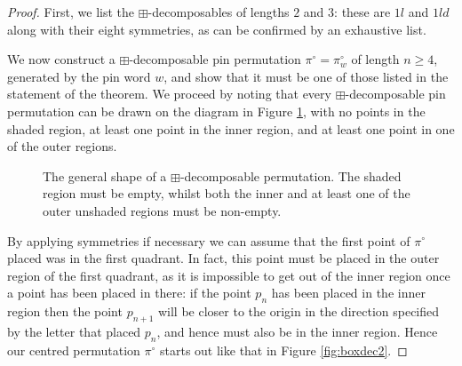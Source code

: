 \documentclass[11pt,a4paper]{article}
\theoremstyle{definition}
\begin{document}
\begin{proof}
First, we list the $\boxplus$-decomposables of lengths $2$ and $3$: these are $1l$ and $1ld$ along with their eight symmetries, as can be confirmed by an exhaustive list.

We now construct a $\boxplus$-decomposable pin permutation $\pi^{\circ} = \pi^{\circ}_{w}$ of length $n \geq 4$, generated by the pin word $w$, and show that it must be one of those listed in the statement of the theorem. We proceed by noting that every $\boxplus$-decomposable pin permutation can be drawn on the diagram in Figure \ref{fig:boxdec1}, with no points in the shaded region, at least one point in the inner region, and at least one point in one of the outer regions.


\begin{figure}[h]
\begin{center}
\end{center}
\caption{The general shape of a $\boxplus$-decomposable permutation. The shaded region must be empty, whilst both the inner and at least one of the outer unshaded regions must be non-empty.}
\label{fig:boxdec1}
\end{figure}

By applying symmetries if necessary we can assume that the first point of $\pi^{\circ}$ placed was in the first quadrant. In fact, this point must be placed in the outer region of the first quadrant, as it is impossible to get out of the inner region once a point has been placed in there: if the point $p_{n}$ has been placed in the inner region then the point $p_{n+1}$ will be closer to the origin in the direction specified by the letter that placed $p_{n}$, and hence must also be in the inner region. Hence our centred permutation $\pi^{\circ}$ starts out like that in Figure \ref{fig:boxdec2}.



\end{proof}
\end{document}
